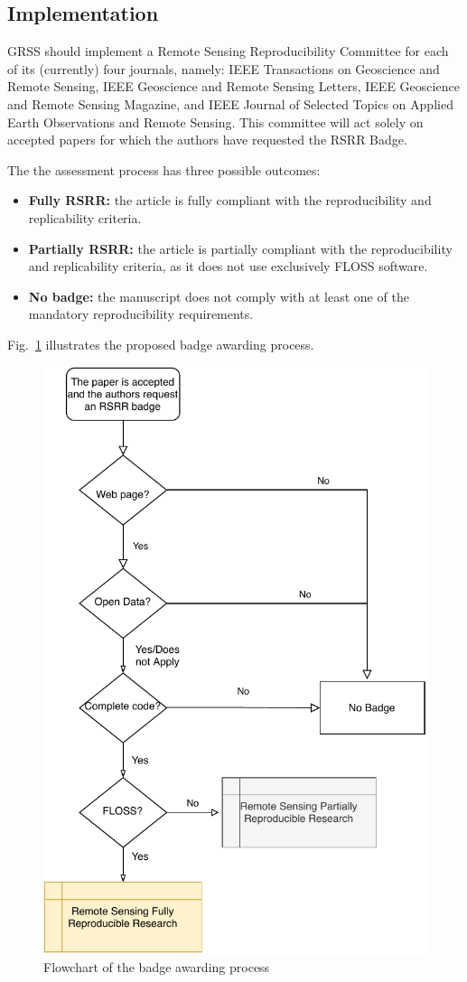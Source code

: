 \documentclass[journal,twoside]{IEEEtran}
\begin{document}
\subsection{Implementation}

GRSS should implement a Remote Sensing Reproducibility Committee for each of its (currently) four journals, namely:
IEEE Transactions on Geoscience and Remote Sensing,
IEEE Geoscience and Remote Sensing Letters,
IEEE Geoscience and Remote Sensing Magazine, and
IEEE Journal of Selected Topics on Applied Earth Observations and Remote Sensing.
This committee will act solely on accepted papers for which the authors have requested the RSRR Badge.

The the assessment process has three possible outcomes:
\begin{itemize}
	\item \textbf{Fully RSRR:} the article is fully compliant with the reproducibility and replicability criteria.
	\item \textbf{Partially RSRR:} the article is partially compliant with the reproducibility and replicability criteria, as it does not use exclusively FLOSS software.
	\item \textbf{No badge:} the manuscript does not comply with at least one of the mandatory reproducibility requirements.
\end{itemize}

Fig.~\ref{Fig:BadgeProcess} illustrates the proposed badge awarding process.

\begin{figure}[hbt]
	\centering
	\includegraphics[width=.7\columnwidth]{BadgeAwardingProcess}
	\caption{Flowchart of the badge awarding process}\label{Fig:BadgeProcess}
\end{figure}
\end{document}
